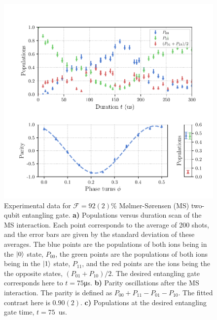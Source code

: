     \begin{figure}
        \begin{center}
        \noindent\includegraphics[width=\linewidth]{
            figures/pdf_figure/ms_gate.pdf
            }
        \end{center}
        \caption{
            Experimental data for $\mathcal{F}=92(2)$\% Mølmer-Sørensen (MS) two-qubit entangling gate.
            \textbf{a)} Populations versus duration scan of the MS interaction.
            Each point corresponds to the average of 200 shots, and the error
            bars are given by the standard deviation of these averages. The blue
            points are the populations of both ions being in the $\ket{0}$
            state, $P_{00}$, the green points are the populations of both ions
            being in the $\ket{1}$ state, $P_{11}$, and the red points are the
            ions being the the opposite states, $(P_{01}+P_{10})/2$. The desired
            entangling gate corresponds here to $t =  75$\unit{\us}. 
            \textbf{b)} Parity oscillations after the MS interaction. The parity
            is defined as $P_{00} + P_{11} - P_{01} - P_{10}$. The fitted
            contrast here is $0.90(2)$.
            \textbf{c)} Populations at the desired entangling gate time, $t =
            75$~\unit{us}.  
            }
        \label{fig:ms_gate}
    \end{figure}

